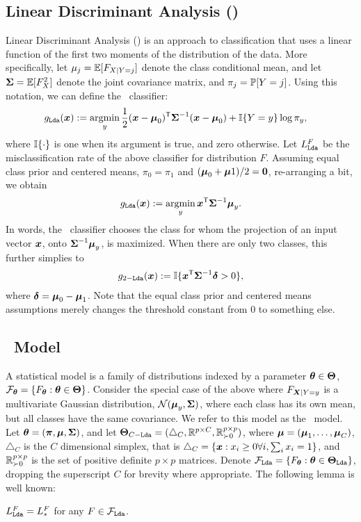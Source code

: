 \documentclass[10pt]{article}
\begin{document}
\subsection{Linear Discriminant Analysis (\Lda)}

Linear Discriminant Analysis (\Lda) is an approach to classification that uses a linear function of the first two moments of the distribution of the data.  More specifically, let $\mu_j=\mathbb{E}[F_{X|Y=j}]$ denote the class conditional mean, and let $\boldsymbol{\Sigma}=\mathbb{E}[F_{X}^2]$ denote the joint covariance matrix, and $\pi_j=\mathbb{P}[Y=j]$.   Using this notation, we can define the \Lda~classifier:
\begin{align*}
g_{\Lda}(\bx)&:=\argmin_y \frac{1}{2} (\bx-\bmu_0)\T \bSig^{-1}(\bx-\bmu_0) + \II\{Y=y\}  \log \pi_y,
\end{align*}  
where $\mathbb{I}\{ \cdot\}$ is one when its argument is true, and zero otherwise.
Let $L_{{\sc \texttt{Lda}}}^F$ be the misclassification rate of the above classifier for distribution $F$.
% 
Assuming equal class prior and centered means,  $\pi_0=\pi_1$ and $(\boldsymbol{\mu}_0+\boldsymbol{\mu}1)/2=\boldsymbol{0}$, re-arranging a bit, we obtain
\begin{align*}
g_{\Lda}(\bx) :=  \argmin_y \bx\T \bSig^{-1} \bmu_y.
\end{align*}
In words, the  \Lda~classifier chooses the class for whom the projection of an input vector $\boldsymbol{x}$, onto $\boldsymbol{\Sigma}^{-1} \boldsymbol{\mu}_y$, is maximized.
% 
When there are only two classes, this further simplies to 
\begin{align*}
g_{2-{\sc \texttt{Lda}}}(\boldsymbol{x}) :=  \mathbb{I}\{ \boldsymbol{x}^{\mathsf{T}} \boldsymbol{\Sigma}^{-1} \boldsymbol{\delta} > 0 \},
\end{align*}
where $\boldsymbol{\delta}=\boldsymbol{\mu}_0-\boldsymbol{\mu}_1$.   Note that the equal class prior and centered means assumptions merely changes the threshold constant from $0$ to something else.  

\subsection{\Lda~Model}

A statistical model is  a family of distributions indexed by a parameter $\boldsymbol{\theta} \in \boldsymbol{\Theta}$, $\mathcal{F}_{\boldsymbol{\theta}}=\{F_{\boldsymbol{\theta}} : \boldsymbol{\theta} \in \boldsymbol{\Theta} \}$.  
Consider the special case of the above where $F_{\boldsymbol{X}|Y=y}$ is a multivariate Gaussian distribution, 
$\mathcal{N}(\boldsymbol{\mu}_y,\boldsymbol{\Sigma})$, where each class has its own mean, but all classes have the same covariance. 
We refer to this model as the \Lda~model. 
Let $\boldsymbol{\theta}=(\boldsymbol{\pi},\boldsymbol{\mu},\boldsymbol{\Sigma})$, and let $\boldsymbol{\Theta}_{C-{\sc \texttt{Lda}}}=( \triangle_C, \mathbb{R}^{p \times C},\mathbb{R}_{\succ 0}^{p \times p})$, where $\boldsymbol{\mu}=(\boldsymbol{\mu}_1,\ldots, \boldsymbol{\mu}_C)$, $\triangle_C$ is the $C$ dimensional simplex, that is $\triangle_C = \{ \boldsymbol{x} : x_i \geq 0 \forall i, \sum_i x_i = 1\}$, and $\mathbb{R}_{\succ 0}^{p \times p}$ is the set of positive definite  $p \times p$ matrices. Denote
$\mathcal{F}_{{\sc \texttt{Lda}}}=\{F_{\boldsymbol{\theta}} : \boldsymbol{\theta} \in \boldsymbol{\Theta}_{{\sc \texttt{Lda}}}\}$, dropping the superscript $C$ for brevity where appropriate.
The following lemma is well known:
\begin{lem}
$L_{{\sc \texttt{Lda}}}^F=L_*^F$ for any $F \in \mathcal{F}_{{\sc \texttt{Lda}}}$.
\end{lem}
\end{document}
